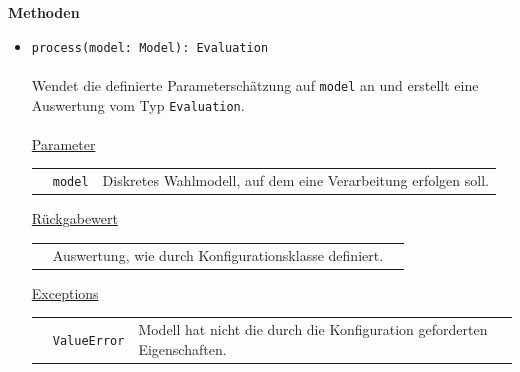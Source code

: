 \documentclass{article}
\begin{document}
\textbf{Methoden}
\begin{itemize}\setlength\itemsep{3em}
\item \texttt{process(model: Model): Evaluation}\\\\
Wendet die definierte Parameterschätzung auf \texttt{model} an und erstellt eine Auswertung vom Typ \texttt{Evaluation}.
\\\\
\underline{Parameter}\\
\begin{tabular}{lll}
 & \texttt{model} & Diskretes Wahlmodell, auf dem eine Verarbeitung erfolgen soll.\\
\end{tabular}

\underline{Rückgabewert}\\
\begin{tabular}{lll}
 & Auswertung, wie durch Konfigurationsklasse definiert.\\
\end{tabular}

\underline{Exceptions}\\
\begin{tabular}{lll}
 & \texttt{ValueError} & Modell hat nicht die durch die Konfiguration geforderten Eigenschaften.\\
\end{tabular}
\end{itemize}

\newpage
\end{document}
